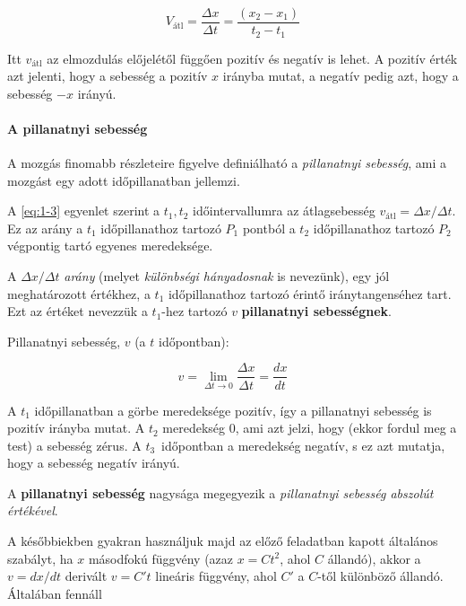 \documentclass[../fizika.tex]{subfiles}
\begin{document}
            \begin{equation} \tag{1-3} \label{eq:1-3}
                V_{\text{átl}} = \frac{\Delta x}{\Delta t} = \frac{(x_2 - x_1)}{t_2 - t_1} 
            \end{equation} 

            \noindent Itt $v_{\text{átl}}$ az elmozdulás  előjelétől függően pozitív és negatív is lehet. A pozitív érték azt jelenti, hogy a sebesség a pozitív $x$ irányba mutat, a negatív pedig azt, hogy a sebesség $-x$ irányú.

            \paragraph{A pillanatnyi sebesség}

                A mozgás finomabb részleteire figyelve definiálható a \textit{pillanatnyi sebesség}, ami a mozgást egy adott időpillanatban jellemzi.

                A \eqref{eq:1-3} egyenlet szerint a $t_1, t_2$ időintervallumra az átlagsebesség $v_{\text{átl}} = \Delta x / \Delta t$. Ez az arány a $t_1$ időpillanathoz tartozó $P_1$ pontból a $t_2$ időpillanathoz tartozó $P_2$ végpontig tartó egyenes meredeksége.

                \noindent A $\Delta x / \Delta t$ \textit{arány} (melyet \textit{különbségi hányadosnak} is nevezünk), egy jól meghatározott értékhez, a $t_1$ időpillanathoz tartozó érintő iránytangenséhez tart. Ezt az értéket nevezzük a $t_1$-hez tartozó $v$ \textbf{pillanatnyi sebességnek}.

                Pillanatnyi sebesség, $v$ (a $t$ időpontban):

                \begin{equation*} \tag{1-4} \label{eq:1-4}
                    v = \lim_{\Delta t \rightarrow 0} \frac{\Delta x}{\Delta t} = \frac{dx}{dt}
                \end{equation*}   
                
                \noindent A $t_1$ időpillanatban a görbe meredeksége pozitív, így a pillanatnyi sebesség is pozitív irányba mutat. A $t_2$ meredekség 0, ami azt jelzi, hogy (ekkor fordul meg a test) a sebesség zérus. A $t_3$ időpontban a meredekség negatív, s ez azt mutatja, hogy a sebesség negatív irányú.

                A \textbf{pillanatnyi sebesség} nagysága megegyezik a \textit{pillanatnyi sebesség abszolút értékével}. 

                A későbbiekben gyakran használjuk majd az előző feladatban kapott általános szabályt, ha $x$ másodfokú függvény (azaz $x = Ct^2$, ahol $C$ állandó), akkor a $v = dx/dt$ derivált $v=C't$ lineáris függvény, ahol $C'$ a $C$-től különböző állandó. Általában fennáll
\end{document}
